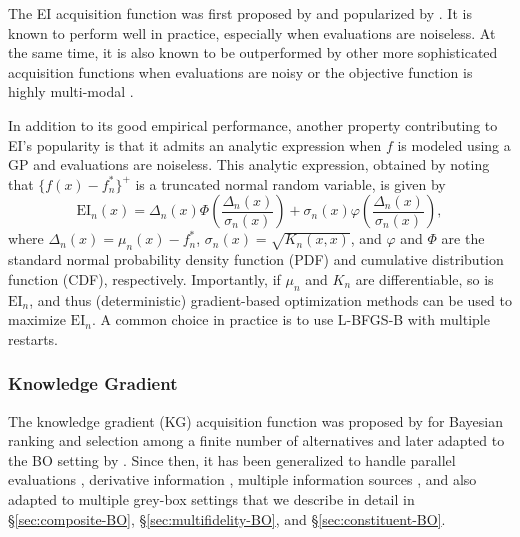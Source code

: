 \documentclass{wscpaperproc}
\newcommand{\EI}{\mathrm{EI}}
\theoremstyle{wsc}
\begin{document}
The EI acquisition function was first proposed by  and popularized by . It is known to perform well in practice, especially when evaluations are noiseless. At the same time, it is also known to be outperformed by other more sophisticated acquisition functions when evaluations are noisy  or the objective function is highly multi-modal .

In addition to its good empirical performance, another property contributing to EI's popularity is that it admits an analytic expression when $f$ is modeled using a GP and evaluations are noiseless. This analytic expression, obtained by noting that $\{f(x) - f_n^*\}^+$ is a truncated normal random variable, is given by
\begin{equation*}
    \EI_n(x) = \Delta_n(x)\Phi\left(\frac{\Delta_n(x)}{\sigma_n(x)}\right) + \sigma_n(x)\varphi\left(\frac{\Delta_n(x)}{\sigma_n(x)}\right),
\end{equation*}
where $\Delta_n(x) = \mu_n(x) - f_n^*$, $\sigma_n(x) = \sqrt{K_{n}(x,x)}$, and $\varphi$ and $\Phi$ are the standard normal probability density function (PDF) and cumulative distribution function (CDF), respectively. Importantly, if $\mu_n$ and $K_n$ are differentiable, so is $\EI_n$, and thus (deterministic) gradient-based optimization methods can be used to maximize $\EI_n$. A common choice in practice is to use L-BFGS-B  with multiple restarts.

\subsubsection{Knowledge Gradient}
The knowledge gradient (KG) acquisition function was proposed by  for Bayesian ranking and selection among a finite number of alternatives and later adapted to the BO setting by . Since then, it has been generalized to handle parallel evaluations , derivative information , multiple information sources , and also adapted to multiple grey-box settings that we describe in detail in 
\S\ref{sec:composite-BO}, \S\ref{sec:multifidelity-BO}, and \S\ref{sec:constituent-BO}. 
\end{document}
